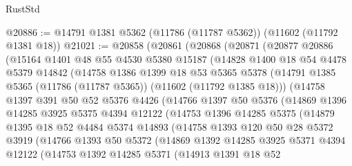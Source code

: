 \begin{lexlean}{RustStd}
\begin{coremodule}
@20886 := @14791 @1381 @5362 (@11786 (@11787 @5362)) (@11602 (@11792 @1381 @18))
@21021 := @20858
    (@20861
      (@20868
        (@20871
          (@20877
            @20886
            (@15164
              @1401
              @48
              @55
              @4530
              @5380
              @15187
              (@14828
                @1400
                @18
                @54
                @4478
                @5379
                @14842
                (@14758
                  @1386
                  @1399
                  @18
                  @53
                  @5365
                  @5378
                  (@14791 @1385 @5365 (@11786 (@11787 @5365)) (@11602 (@11792 @1385 @18)))
                  (@14758
                    @1397
                    @391
                    @50
                    @52
                    @5376
                    @4426
                    (@14766
                      @1397
                      @50
                      @5376
                      (@14869
                        @1396
                        @14285
                        @3925
                        @5375
                        @4394
                        @12122
                        (@14753
                          @1396
                          @14285
                          @5375
                          (@14879
                            @1395
                            @18
                            @52
                            @4484
                            @5374
                            @14893
                            (@14758
                              @1393
                              @120
                              @50
                              @28
                              @5372
                              @3919
                              (@14766
                                @1393
                                @50
                                @5372
                                (@14869
                                  @1392
                                  @14285
                                  @3925
                                  @5371
                                  @4394
                                  @12122
                                  (@14753
                                    @1392
                                    @14285
                                    @5371
                                    (@14913
                                      @1391
                                      @18
                                      @52

\end{coremodule}
\end{lexlean}
